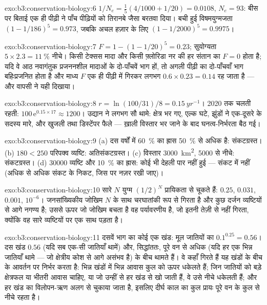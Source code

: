 \begin{solution}{exo:b3:conservation-biology:6}
$1/N_{e} = \tfrac{1}{5}(4/1000 + 1/20) = 0.0108$, $N_{e} = 93$: बीस पर
बिताई एक ही पीढ़ी ने पाँच पीढ़ियों को तिरानबे जैसा बरतवा दिया। बची हुई
विषमयुग्मजता $(1 - 1/186)^{5} = 0.973$, जबकि अचल हज़ार के लिए $(1 -
1/2000)^{5} = 0.9975$।
\end{solution}

\begin{solution}{exo:b3:conservation-biology:7}
$F = 1 - (1 - 1/20)^{5} = 0.23$; सुयोग्यता $5\times 2.3 = \qty{11}{\%}$
नीचे। किसी टेक्सस मादा और किसी फ़्लोरिडा नर की हर संतान का $F = 0$ होता
है; यदि वे आठ नवागंतुक प्रजननशील मादाओं के दो-पाँचवें भाग हों, तो अगली
पीढ़ी का दो-पाँचवाँ भाग बहिःप्रजनित होता है और माध्य $F$ एक ही पीढ़ी में
गिरकर लगभग $0.6\times 0.23 = 0.14$ रह जाता है --- और वापसी ने यही
दिखाया।
\end{solution}

\begin{solution}{exo:b3:conservation-biology:8}
$r = \ln(100/31)/8 = \qty{0.15}{yr^{-1}}$। 2020 तक चलती रहती:
$100\,\mathrm{e}^{0.15\times 17} \approx 1200$। उद्यान ने लगभग सौ थामे:
क्षेत्र भर गए, एल्क घटे, झुंडों ने एक-दूसरे के सदस्य मारे, और खुजली तथा
डिस्टेंपर फैले --- ख़ाली विस्तार भर जाने के बाद घनत्व-निर्भरता बैठ गई।
\end{solution}

\begin{solution}{exo:b3:conservation-biology:9}
(a) दस वर्षों में \qty{60}{\%} का ह्रास \qty{50}{\%} से अधिक है:
संकटग्रस्त। (b) $180 < 250$ परिपक्व व्यष्टि: अतिसंकटग्रस्त। (c) विस्तार
\qty{3000}{km^2}, \qty{5000}{} से नीचे: संकटग्रस्त। (d) \num{30000}
व्यष्टि और \qty{10}{\%} का ह्रास: कोई भी देहली पार नहीं हुई --- संकट में
नहीं (अधिक से अधिक संकट के निकट, जिस पर नज़र रखी जाए)।
\end{solution}

\begin{solution}{exo:b3:conservation-biology:10}
सारे $N$ युग्म $(1/2)^{N}$ प्रायिकता से चूकते हैं: $0.25$, $0.031$,
$0.001$, $10^{-6}$। जनसांख्यिकीय जोखिम $N$ के साथ चरघातांकी रूप से गिरता
है और कुछ दर्जन व्यष्टियों से आगे नगण्य है; उससे ऊपर जो जोखिम बचता है वह
पर्यावरणीय है, जो इतनी तेज़ी से नहीं गिरता, क्योंकि वह सारे व्यष्टियों
पर एक साथ पड़ता है।
\end{solution}

\begin{solution}{exo:b3:conservation-biology:11}
दसवें भाग का कोई एक खंड: मूल जातियों का $0.1^{0.25} = 0.56$। दस खंड
$0.56$ (यदि सब एक-सी जातियाँ थामें) और, सिद्धांततः, पूरे वन से अधिक (यदि
हर एक भिन्न जातियाँ थामे --- जो क्षेत्रीय कोश से आगे असंभव है) के बीच
थामते हैं। वे कहाँ गिरते हैं यह खंडों के बीच के आवर्तन पर निर्भर करता
है: भिन्न खंडों में भिन्न आवास कुल को ऊपर धकेलते हैं; जिन जातियों को बड़े
क्षेत्रफल या भीतरी आवास चाहिए, या जो उन्हीं  से हर खंड से
खो जाती हैं, वे उसे नीचे धकेलती हैं; और हर खंड का विलोपन-ऋण अलग से
चुकाया जाता है, इसलिए दीर्घ काल का कुल प्रायः पूरे वन के कुल से नीचे
रहता है।
\end{solution}

